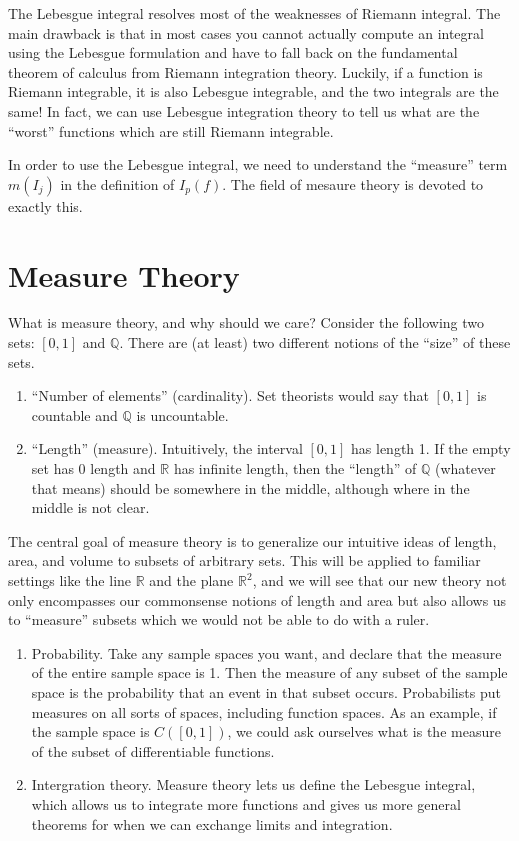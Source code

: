 \documentclass[12pt]{amsart}         %
\theoremstyle{remark}
\newcommand{\R}{\mathbb{R}}
\newcommand{\Q}{\mathbb{Q}}
\begin{document}
The Lebesgue integral resolves most of the weaknesses of Riemann integral. The main drawback is that in most cases you cannot actually compute an integral using the Lebesgue formulation and have to fall back on the fundamental theorem of calculus from Riemann integration theory. Luckily, if a function is Riemann integrable, it is also Lebesgue integrable, and the two integrals are the same! In fact, we can use Lebesgue integration theory to tell us what are the ``worst'' functions which are still Riemann integrable.

In order to use the Lebesgue integral, we need to understand the ``measure'' term $m(I_j)$ in the definition of $I_p(f)$. The field of mesaure theory is devoted to exactly this.

\section{Measure Theory}

What is measure theory, and why should we care? Consider the following two sets: $[0, 1]$ and $\Q$. There are (at least) two different notions of the ``size'' of these sets.
\begin{enumerate}
    \item ``Number of elements'' (cardinality). Set theorists would say that $[0, 1]$ is countable and $\Q$ is uncountable. 
    \item ``Length'' (measure). Intuitively, the interval $[0, 1]$ has length 1. If the empty set has 0 length and $\R$ has infinite length, then the ``length'' of $\Q$ (whatever that means) should be somewhere in the middle, although where in the middle is not clear.
\end{enumerate}

The central goal of measure theory is to generalize our intuitive ideas of length, area, and volume to subsets of arbitrary sets. This will be applied to familiar settings like the line $\R$ and the plane $\R^2$, and we will see that our new theory not only encompasses our commonsense notions of length and area but also allows us to ``measure'' subsets which we would not be able to do with a ruler.

\begin{enumerate}
	\item Probability. Take any sample spaces you want, and declare that the measure of the entire sample space is 1. Then the measure of any subset of the sample space is the probability that an event in that subset occurs. Probabilists put measures on all sorts of spaces, including function spaces. As an example, if the sample space is $C([0, 1])$, we could ask ourselves what is the measure of the subset of differentiable functions.

	\item Intergration theory. Measure theory lets us define the Lebesgue integral, which allows us to integrate more functions and gives us more general theorems for when we can exchange limits and integration.
\end{enumerate}
\end{document}
